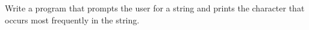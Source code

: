 Write a program that prompts the user for a string and prints the character that occurs most frequently in the string.

